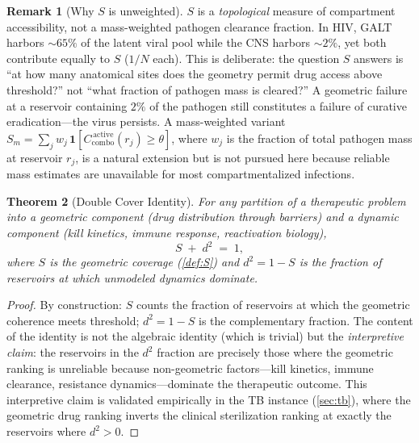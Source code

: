 \documentclass[11pt]{article}
\theoremstyle{plain}
\newtheorem{theorem}{Theorem}[section]
\theoremstyle{definition}
\newtheorem{remark}[theorem]{Remark}
\newcommand{\Ccombo}{C_{\mathrm{combo}}}
\begin{document}
\begin{remark}[Why $S$ is unweighted]
\label{rem:S-unweighted}
$S$ is a \emph{topological} measure of compartment accessibility,
not a mass-weighted pathogen clearance fraction. In HIV, GALT
harbors ${\sim}65\%$ of the latent viral pool while the CNS harbors
${\sim}2\%$, yet both contribute equally to $S$ ($1/N$ each). This
is deliberate: the question $S$ answers is ``at how many anatomical
sites does the geometry permit drug access above threshold?'' not
``what fraction of pathogen mass is cleared?'' A geometric failure
at a reservoir containing $2\%$ of the pathogen still constitutes a
failure of curative eradication---the virus persists. A
mass-weighted variant $S_m = \sum_j w_j \,
\mathbf{1}[\Ccombo^{\,\mathrm{active}}(r_j) \geq \theta]$, where
$w_j$ is the fraction of total pathogen mass at reservoir $r_j$,
is a natural extension but is not pursued here because reliable
mass estimates are unavailable for most compartmentalized
infections.
\end{remark}

\begin{theorem}[Double Cover Identity]
\label{thm:double-cover}
For any partition of a therapeutic problem into a geometric
component (drug distribution through barriers) and a dynamic
component (kill kinetics, immune response, reactivation biology),
\begin{equation}
  \label{eq:double-cover}
  \boxed{\;S \;+\; d^2 \;=\; 1,\;}
\end{equation}
where $S$ is the geometric coverage (\cref{def:S}) and
$d^2 = 1 - S$ is the fraction of reservoirs at which unmodeled
dynamics dominate.
\end{theorem}

\begin{proof}
By construction: $S$ counts the fraction of reservoirs at which
the geometric coherence meets threshold; $d^2 = 1 - S$ is the
complementary fraction. The content of the identity is not the
algebraic identity (which is trivial) but the \emph{interpretive
claim}: the reservoirs in the $d^2$ fraction are precisely those
where the geometric ranking is unreliable because non-geometric
factors---kill kinetics, immune clearance, resistance
dynamics---dominate the therapeutic outcome. This interpretive
claim is validated empirically in the TB instance
(\cref{sec:tb}), where the geometric drug ranking inverts the
clinical sterilization ranking at exactly the reservoirs where
$d^2 > 0$.
\end{proof}
\end{document}

